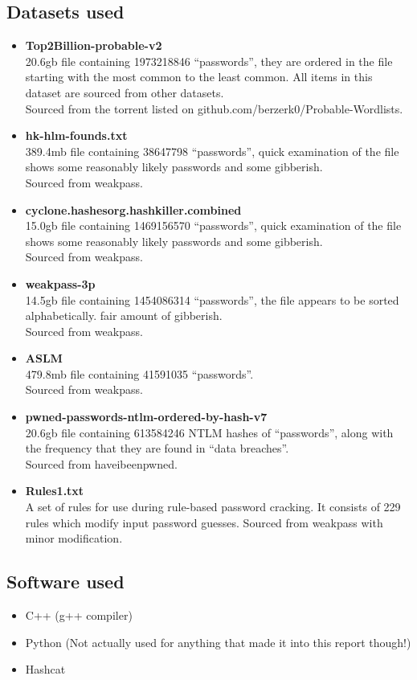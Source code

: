 \documentclass[11pt]{article}
\begin{document}
\subsection{Datasets used} \label{datasets}
\begin{itemize}
\item \textbf{Top2Billion-probable-v2}\\
20.6gb file containing 1973218846 ``passwords'', they are ordered in the file starting with the most common to the least common. All items in this dataset are sourced from other datasets.\\
Sourced from the torrent listed on github.com/berzerk0/Probable-Wordlists.
\item \textbf{hk-hlm-founds.txt}\\
389.4mb file containing 38647798 ``passwords'', quick examination of the file shows some reasonably likely passwords and some gibberish.\\
Sourced from weakpass.
\item \textbf{cyclone.hashesorg.hashkiller.combined}\\
15.0gb file containing 1469156570 ``passwords'', quick examination of the file shows some reasonably likely passwords and some gibberish.\\
Sourced from weakpass.
\item \textbf{weakpass-3p}\\
14.5gb file containing 1454086314 ``passwords'', the file appears to be sorted alphabetically. fair amount of gibberish.\\
Sourced from weakpass.
\item \textbf{ASLM}\\
479.8mb file containing 41591035 ``passwords''.\\
Sourced from weakpass.
\item \textbf{pwned-passwords-ntlm-ordered-by-hash-v7}\\
20.6gb file containing 613584246 NTLM hashes of ``passwords'', along with the frequency that they are found in ``data breaches''.\\
Sourced from haveibeenpwned.
\item \textbf{Rules1.txt}\\
A set of rules for use during rule-based password cracking. It consists of 229 rules which modify input password guesses.
Sourced from weakpass with minor modification.
\end{itemize}


\subsection{Software used}
\begin{itemize}
\item C++ (g++ compiler)
\item Python (Not actually used for anything that made it into this report though!)
\item Hashcat
\end{itemize}
\end{document}
